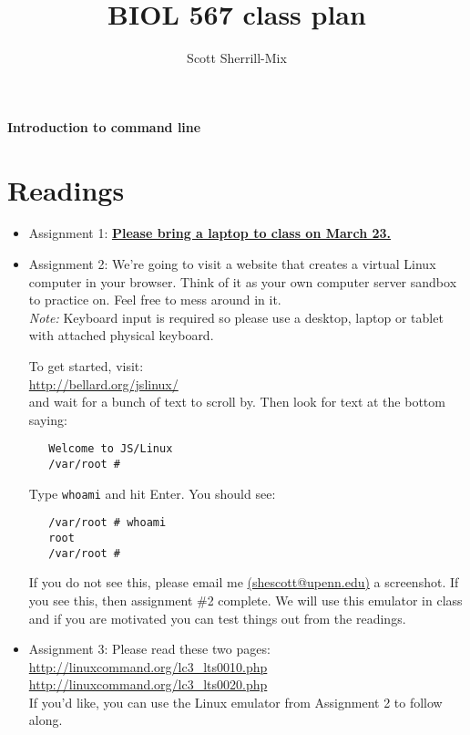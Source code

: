 \documentclass[12pt]{article}
\title{BIOL 567 class plan}
\date{}
\author{Scott Sherrill-Mix}
\begin{document}
\thispagestyle{plain}
\begin{center}
	\Large{\textbf{Introduction to command line}}
\end{center}
\section*{Readings}
\begin{itemize}
\item Assignment 1: \underline{\textbf{Please bring a laptop to class on March 23.}}


\item Assignment 2: We're going to visit a website that creates a virtual Linux computer in your browser. Think of it as your own computer server sandbox to practice on. Feel free to mess around in it.\\ \emph{Note:} Keyboard input is required so please use a desktop, laptop or tablet with attached physical keyboard. 

To get started, visit:\\
\url{http://bellard.org/jslinux/}\\
and wait for a bunch of text to scroll by. Then look for text at the bottom saying:
\vspace{-1em}
\begin{verbatim}
   Welcome to JS/Linux
   /var/root #
\end{verbatim} \vspace{-1em}
Type \texttt{whoami} and hit Enter. You should see:
\vspace{-1em}
\begin{verbatim}
   /var/root # whoami
   root
   /var/root #
\end{verbatim}
\vspace{-1em}
If you do not see this, please email me \href{mailto:shescott@upenn.edu}{(shescott@upenn.edu)} a screenshot. If you see this, then assignment \#2 complete. We will use this emulator in class and if you are motivated you can test things out from the readings.

\item Assignment 3: Please read these two pages:\\
  \hphantom{aaa}\url{http://linuxcommand.org/lc3_lts0010.php}\\
  \hphantom{aaa}\url{http://linuxcommand.org/lc3_lts0020.php}\\
  If you'd like, you can use the Linux emulator from Assignment 2 to follow along.
\end{itemize}
\end{document}
